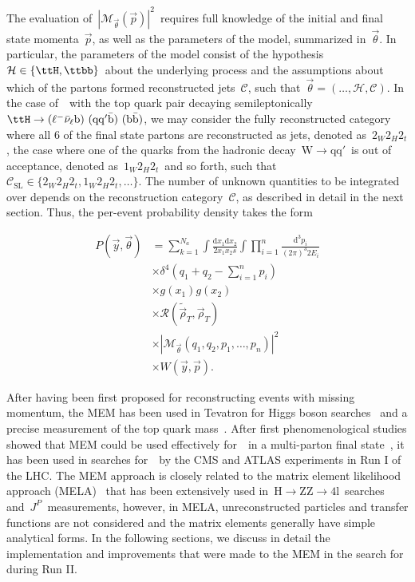 The evaluation of~$|\mathcal{M}_{\vec{\theta}}(\vec{p})|^2$~requires full knowledge of the initial and final state momenta~$\vec{p}$, as well as the parameters of the model, summarized in~$\vec{\theta}$. In particular, the parameters of the model consist of the hypothesis~$\mathcal{H} \in \{\ttH, \ttbb\}$~about the underlying process and the assumptions about which of the partons formed reconstructed jets~$\mathcal{C}$, such that~$\vec{\theta} = (\dots, \mathcal{H}, \mathcal{C})$. In the case of~\ttH~with the top quark pair decaying semileptonically~$\ttH \rightarrow (\ell^- \bar{\mathrm{\nu}}_\ell \mathrm{b})\ (\mathrm{q} \mathrm{q}' \bar{\mathrm{b}})\ (\mathrm{b} \bar{\mathrm{b}})$, we may consider the fully reconstructed category where all 6 of the final state partons are reconstructed as jets, denoted as~$2_W 2_H 2_t$, the case where one of the quarks from the hadronic decay~$\mathrm{W} \rightarrow \mathrm{q} \mathrm{q}'$~is out of acceptance, denoted as~$1_W 2_H 2_t$~and so forth, such that~$\mathcal{C}_{\mathrm{SL}} \in \{ 2_W 2_H 2_t, 1_W 2_H 2_t, \dots \}$. The number of unknown quantities to be integrated over depends on the reconstruction category~$\mathcal{C}$, as described in detail in the next section. 
Thus, the per-event probability density takes the form

\begin{align}
\label{eq:mem_definition}
P(\vec{y}, \vec{\theta}) &= \sum_{k=1}^{N_a} \int \frac{\mathrm{d}x_1 \mathrm{d}x_2}{2 x_1 x_2 s} \int \prod_{i=1}^{n} \frac{\mathrm{d}^3 p_i}{(2\pi)^3 2 E_i} \\
&\times \delta^4 (q_1 + q_2 - \sum_{i=1}^n p_i)\\
&\times g(x_1) g(x_2) \\ 
&\times \mathcal{R}(\tilde{\vec{\rho}}_T, \vec{\rho}_T) \\ 
&\times |\mathcal{M}_{\vec{\theta}}(q_1, q_2, p_1, \dots, p_n)|^2 \\
&\times W(\vec{y}, \vec{p}).
\end{align}

After having been first proposed for reconstructing events with missing momentum\cite{Kondo:1988yd}, the MEM has been used in Tevatron for Higgs boson searches~\cite{Aaltonen:2009dh,Aaltonen:2011rt} and a precise measurement of the top quark mass~\cite{D0topmass2004}. After first phenomenological studies showed that MEM could be used effectively for~\ttH~in a multi-parton final state~\cite{Artoisenet:2013vfa}, it has been used in searches for~\ttHbb~by the CMS and ATLAS experiments in Run I of the LHC\cite{Aad:2015gra,Khachatryan:2015ila}. The MEM approach is closely related to the matrix element likelihood approach (MELA)~\cite{Gao:2010qx} that has been extensively used in~$\mathrm{H} \rightarrow \mathrm{ZZ} \rightarrow 4\mathrm{l}$~searches and~$J^P$~measurements, however, in MELA, unreconstructed particles and transfer functions are not considered and the matrix elements generally have simple analytical forms.
In the following sections, we discuss in detail the implementation and improvements that were made to the MEM in the search for \ttHbb during Run II.

